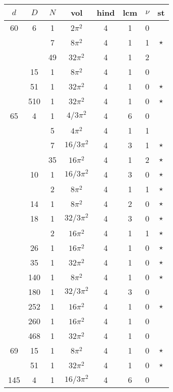 \documentclass[12pt]{amsart}
\providecommand{\DIFadd}[1]{{\protect\color{blue}\uwave{#1}}} %
\providecommand{\DIFdel}[1]{{\protect\color{red}\sout{#1}}}                      %
\providecommand{\DIFaddbegin}{} %
\providecommand{\DIFaddend}{} %
\providecommand{\DIFdelbegin}{} %
\providecommand{\DIFdelend}{} %
\begin{document}
\begin{tabular}{ccc|ccccc}
$d$ & $D$ & $N$ & vol & hind & lcm & $\nu$ & st\\
\hline
60 & 6 & 1 & $2\pi^2$ & 4 & 1 & 0 &  \\
 &  & 7 & $8\pi^2$ & 4 & 1 & 1 & $\star$ \\
 &  & 49 & $32\pi^2$ & 4 & 1 & 2 &  \\
 & 15 & 1 & $8\pi^2$ & 4 & 1 & 0 &  \\
 & 51 & 1 & $32\pi^2$ & 4 & 1 & 0 & $\star$ \\
 & 510 & 1 & $32\pi^2$ & 4 & 1 & 0 & $\star$ \\
65 & 4 & 1 & \DIFdelbegin \DIFdel{$4/3\pi^2$ }\DIFdelend \DIFaddbegin \DIFadd{$(4/3)\pi^2$ }\DIFaddend & 4 & 6 & 0 &  \\
 &  & 5 & $4\pi^2$ & 4 & 1 & 1 &  \\
 &  & 7 & \DIFdelbegin \DIFdel{$16/3\pi^2$ }\DIFdelend \DIFaddbegin \DIFadd{$(16/3)\pi^2$ }\DIFaddend & 4 & 3 & 1 & $\star$ \\
 &  & 35 & $16\pi^2$ & 4 & 1 & 2 & $\star$ \\
 & 10 & 1 & \DIFdelbegin \DIFdel{$16/3\pi^2$ }\DIFdelend \DIFaddbegin \DIFadd{$(16/3)\pi^2$ }\DIFaddend & 4 & 3 & 0 & $\star$ \\
 &  & 2 & $8\pi^2$ & 4 & 1 & 1 & $\star$ \\
 & 14 & 1 & $8\pi^2$ & 4 & 2 & 0 & $\star$ \\
 & 18 & 1 & \DIFdelbegin \DIFdel{$32/3\pi^2$ }\DIFdelend \DIFaddbegin \DIFadd{$(32/3)\pi^2$ }\DIFaddend & 4 & 3 & 0 & $\star$ \\
 &  & 2 & $16\pi^2$ & 4 & 1 & 1 & $\star$ \\
 & 26 & 1 & $16\pi^2$ & 4 & 1 & 0 & $\star$ \\
 & 35 & 1 & $32\pi^2$ & 4 & 1 & 0 & $\star$ \\
 & 140 & 1 & $8\pi^2$ & 4 & 1 & 0 & $\star$ \\
 & 180 & 1 & \DIFdelbegin \DIFdel{$32/3\pi^2$ }\DIFdelend \DIFaddbegin \DIFadd{$(32/3)\pi^2$ }\DIFaddend & 4 & 3 & 0 &  \\
 & 252 & 1 & $16\pi^2$ & 4 & 1 & 0 & $\star$ \\
 & 260 & 1 & $16\pi^2$ & 4 & 1 & 0 &  \\
 & 468 & 1 & $32\pi^2$ & 4 & 1 & 0 &  \\
69 & 15 & 1 & $8\pi^2$ & 4 & 1 & 0 & $\star$ \\
 & 51 & 1 & $32\pi^2$ & 4 & 1 & 0 & $\star$ \\
145 & 4 & 1 & \DIFdelbegin \DIFdel{$16/3\pi^2$ }\DIFdelend \DIFaddbegin \DIFadd{$(16/3)\pi^2$ }\DIFaddend & 4 & 6 & 0 &  \\

\end{tabular}
\end{document}
